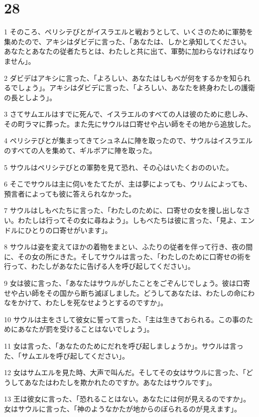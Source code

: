 \chapter{28}

\par 1 そのころ、ペリシテびとがイスラエルと戦おうとして、いくさのために軍勢を集めたので、アキシはダビデに言った、「あなたは、しかと承知してください。あなたとあなたの従者たちとは、わたしと共に出て、軍勢に加わらなければなりません」。
\par 2 ダビデはアキシに言った、「よろしい、あなたはしもべが何をするかを知られるでしょう」。アキシはダビデに言った、「よろしい、あなたを終身わたしの護衛の長としよう」。
\par 3 さてサムエルはすでに死んで、イスラエルのすべての人は彼のために悲しみ、その町ラマに葬った。また先にサウルは口寄せや占い師をその地から追放した。
\par 4 ペリシテびとが集まってきてシュネムに陣を取ったので、サウルはイスラエルのすべての人を集めて、ギルボアに陣を取った。
\par 5 サウルはペリシテびとの軍勢を見て恐れ、その心はいたくおののいた。
\par 6 そこでサウルは主に伺いをたてたが、主は夢によっても、ウリムによっても、預言者によっても彼に答えられなかった。
\par 7 サウルはしもべたちに言った、「わたしのために、口寄せの女を捜し出しなさい。わたしは行ってその女に尋ねよう」。しもべたちは彼に言った、「見よ、エンドルにひとりの口寄せがいます」。
\par 8 サウルは姿を変えてほかの着物をまとい、ふたりの従者を伴って行き、夜の間に、その女の所にきた。そしてサウルは言った、「わたしのために口寄せの術を行って、わたしがあなたに告げる人を呼び起してください」。
\par 9 女は彼に言った、「あなたはサウルがしたことをごぞんじでしょう。彼は口寄せや占い師をその国から断ち滅ぼしました。どうしてあなたは、わたしの命にわなをかけて、わたしを死なせようとするのですか」。
\par 10 サウルは主をさして彼女に誓って言った、「主は生きておられる。この事のためにあなたが罰を受けることはないでしょう」。
\par 11 女は言った、「あなたのためにだれを呼び起しましょうか」。サウルは言った、「サムエルを呼び起してください」。
\par 12 女はサムエルを見た時、大声で叫んだ。そしてその女はサウルに言った、「どうしてあなたはわたしを欺かれたのですか。あなたはサウルです」。
\par 13 王は彼女に言った、「恐れることはない。あなたには何が見えるのですか」。女はサウルに言った、「神のようなかたが地からのぼられるのが見えます」。
